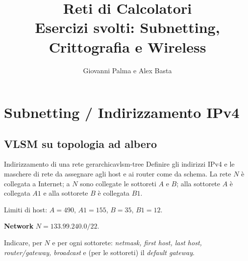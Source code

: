 \documentclass{report}
\title{\Huge{Reti di Calcolatori}\\Esercizi svolti: Subnetting, Crittografia e Wireless}
\author{\huge{Giovanni Palma e Alex Basta}}
\date{}
\begin{document}
\maketitle
\newpage
{}
\tableofcontents
\pagebreak

\chapter{Subnetting / Indirizzamento IPv4}

\section{VLSM su topologia ad albero}

\begin{Exercise}{Indirizzamento di una rete gerarchica}{vlsm-tree}
Definire gli indirizzi IPv4 e le maschere di rete da assegnare agli host e ai
router come da schema. La rete $N$ è collegata a Internet; a $N$ sono collegate
le sottoreti $A$ e $B$; alla sottorete $A$ è collegata $A1$ e alla sottorete $B$
è collegata $B1$.

\medskip
Limiti di host: $A=490$, $A1=155$, $B=35$, $B1=12$.

\medskip
\textbf{Network} $N = 133.99.240.0/22$.

Indicare, per $N$ e per ogni sottorete: \emph{netmask, first host, last host,
router/gateway, broadcast} e (per le sottoreti) il \emph{default gateway}.
\end{Exercise}
\end{document}

